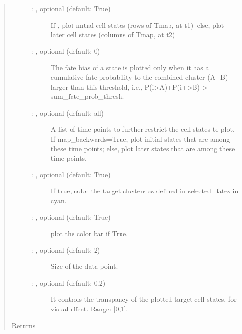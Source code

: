 \documentclass[letterpaper,10pt,english]{sphinxmanual}
\begin{document}
\begin{fulllineitems}
\begin{quote}
\begin{description}
\begin{description}
\item[{ : , optional (default: True)}] \leavevmode
If , plot initial cell states (rows of Tmap, at t1);
else, plot later cell states (columns of Tmap, at t2)

\item[{ : , optional (default: 0)}] \leavevmode
The fate bias of a state is plotted only when it has a cumulative fate
probability to the combined cluster (A+B) larger than this threshold,
i.e., P(i\sphinxhyphen{}\textgreater{}A)+P(i+\textgreater{}B) \textgreater{}  sum\_fate\_prob\_thresh.

\item[{ : , optional (default: all)}] \leavevmode
A list of time points to further restrict the cell states to plot.
If map\_backwards=True, plot initial states that are among these time points;
else, plot later states that are among these time points.

\item[{ : , optional (default: True)}] \leavevmode
If true, color the target clusters as defined in selected\_fates in cyan.

\item[{ : , optional (default: True)}] \leavevmode
plot the color bar if True.

\item[{ : , optional (default: 2)}] \leavevmode
Size of the data point.

\item[{ : , optional (default: 0.2)}] \leavevmode
It controls the transpancy of the plotted target cell states,
for visual effect. Range: {[}0,1{]}.

\end{description}

\item[{Returns}] \leavevmode
{}

\end{description}\end{quote}

\end{fulllineitems}
\end{document}
